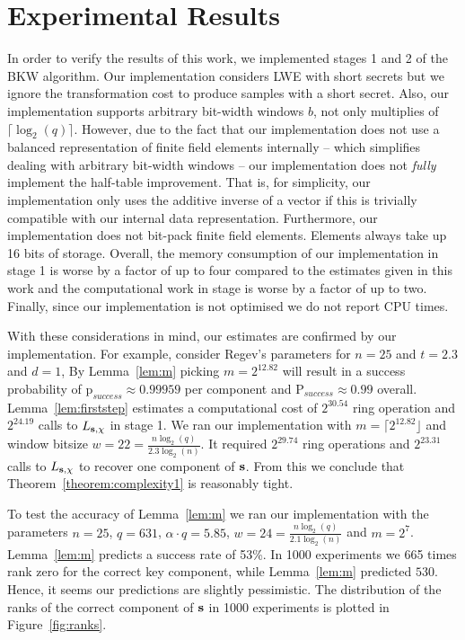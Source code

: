 \section{Experimental Results}
\label{sec:implementation}
In order to verify the results of this work, we implemented stages 1 and 2 of the BKW algorithm. Our implementation considers LWE with short secrets but we ignore the transformation cost to produce samples with a short secret. Also, our implementation supports arbitrary bit-width windows $b$, not only multiplies of $\lceil \log_2(q)\rceil$. However, due to the fact that our implementation does not use a balanced representation of finite field elements internally -- which simplifies dealing with arbitrary bit-width windows -- our implementation does not \emph{fully} implement the half-table improvement. That is, for simplicity, our implementation only uses the additive inverse of a vector if this is trivially compatible with our internal data representation. Furthermore, our implementation does not bit-pack finite field elements. Elements always take up 16 bits of storage. Overall, the memory consumption of our implementation in stage 1 is worse by a factor of up to four compared to the estimates given in this work and the computational work in stage is worse by a factor of up to two. Finally, since our implementation is not optimised we do not report CPU times.

With these considerations in mind, our estimates are confirmed by our implementation. For example, consider Regev's parameters for $n=25$ and $t=2.3$ and $d=1$, By Lemma~\ref{lem:m} picking $m=2^{12.82}$ will result in a success probability of $\mathrm{p}_{success} \approx 0.99959$ per component and $\mathrm{P}_{success} \approx 0.99$ overall. Lemma~\ref{lem:firststep} estimates a computational cost of $2^{30.54}$ ring operation and $2^{24.19}$ calls to $L_{\mathbf{s},\chi}$ in stage 1. We ran our implementation with $m = \lceil 2^{12.82} \rfloor$ and window bitsize $w = 22 = \frac{n\log_2(q)}{2.3\log_2(n)}$. It required $2^{29.74}$ ring operations and $2^{23.31}$ calls to $L_{\mathbf{s},\chi}$ to recover one component of $\mathbf{s}$. From this we conclude that Theorem~\ref{theorem:complexity1} is reasonably tight.

To test the accuracy of Lemma~\ref{lem:m} we ran our implementation with the parameters $n=25$, $q=631$, $\alpha \cdot q = 5.85$, $w = 24 = \frac{n\log_2(q)}{2.1\log_2(n)}$ and $m=2^7$. Lemma~\ref{lem:m} predicts a success rate of 53\%. In 1000 experiments we 665 times rank zero for the correct key component, while Lemma~\ref{lem:m} predicted $530$. Hence, it seems our predictions are slightly pessimistic. The distribution of the ranks of the correct component of $\mathbf{s}$ in 1000 experiments is plotted in Figure~\ref{fig:ranks}.

